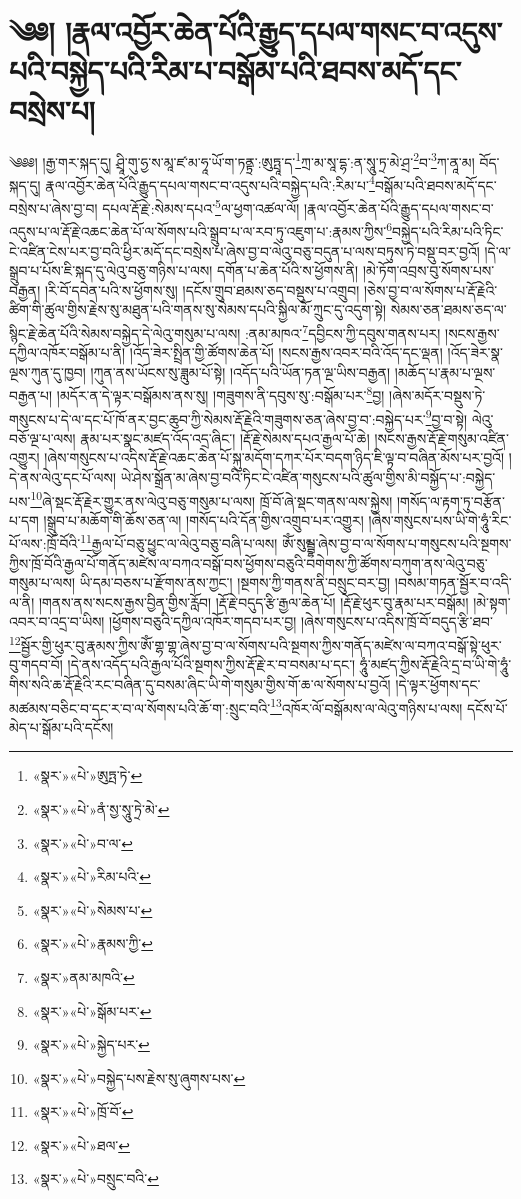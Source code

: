 \chapter{༄༅། །རྣལ་འབྱོར་ཆེན་པོའི་རྒྱུད་དཔལ་གསང་བ་འདུས་པའི་བསྐྱེད་པའི་རིམ་པ་བསྒོམ་པའི་ཐབས་མདོ་དང་བསྲེས་པ།}༄༅༅། །རྒྱ་གར་སྐད་དུ། ཤྲཱི་གུ་ཧྱ་ས་མཱ་ཛ་མ་ཧཱ་ཡོ་ག་ཏནྟྲ་:ཨུཏྤཱ་ད་\footnote{«སྣར་»«པེ་»ཨུཏྤ་ཏེ་}ཀྲ་མ་སཱ་དྷ་:ན་སཱུ་ཏྲ་མེ་ཤྲ་\footnote{«སྣར་»«པེ་»ནཾ་སྱ་སཱུ་ཏྲེ་མེ་}བ་\footnote{«སྣར་»«པེ་»བ་ལ་}ཀ་ནཱ་མ། བོད་སྐད་དུ། རྣལ་འབྱོར་ཆེན་པོའི་རྒྱུད་དཔལ་གསང་བ་འདུས་པའི་བསྐྱེད་པའི་:རིམ་པ་\footnote{«སྣར་»«པེ་»རིམ་པའི་}བསྒོམ་པའི་ཐབས་མདོ་དང་བསྲེས་པ་ཞེས་བྱ་བ། དཔལ་རྡོ་རྗེ་:སེམས་དཔའ་\footnote{«སྣར་»«པེ་»སེམས་པ་}ལ་ཕྱག་འཚལ་ལོ། །རྣལ་འབྱོར་ཆེན་པོའི་རྒྱུད་དཔལ་གསང་བ་འདུས་པ་ལ་རྡོ་རྗེ་འཆང་ཆེན་པོ་ལ་སོགས་པའི་སྒྲུབ་པ་ལ་རབ་ཏུ་འཇུག་པ་:རྣམས་ཀྱིས་\footnote{«སྣར་»«པེ་»རྣམས་ཀྱི་}བསྐྱེད་པའི་རིམ་པའི་ཏིང་ངེ་འཛིན་ངེས་པར་བྱ་བའི་ཕྱིར་མདོ་དང་བསྲེས་པ་ཞེས་བྱ་བ་ལེའུ་བཅུ་བདུན་པ་ལས་བཏུས་ཏེ་བསྡུ་བར་བྱའོ། །དེ་ལ་སྒྲུབ་པ་པོས་ཇི་སྐད་དུ་ལེའུ་བཅུ་གཉིས་པ་ལས། དགོན་པ་ཆེན་པོའི་ས་ཕྱོགས་ནི། །མེ་ཏོག་འབྲས་བུ་སོགས་པས་བརྒྱན། །རི་བོ་དབེན་པའི་ས་ཕྱོགས་སུ། །དངོས་གྲུབ་ཐམས་ཅད་བསྡུས་པ་འགྲུབ། །ཅེས་བྱ་བ་ལ་སོགས་པ་རྡོ་རྗེའི་ཚིག་གི་ཚུལ་གྱིས་རྗེས་སུ་མཐུན་པའི་གནས་སུ་སེམས་དཔའི་སྐྱིལ་མོ་ཀྲུང་དུ་འདུག་སྟེ། སེམས་ཅན་ཐམས་ཅད་ལ་སྙིང་རྗེ་ཆེན་པོའི་སེམས་བསྐྱེད་དེ་ལེའུ་གསུམ་པ་ལས། :ནམ་མཁའ་\footnote{«སྣར་»ནམ་མཁའི་}དབྱིངས་ཀྱི་དབུས་གནས་པར། །སངས་རྒྱས་དཀྱིལ་འཁོར་བསྒོམ་པ་ནི། །འོད་ཟེར་སྤྲིན་གྱི་ཚོགས་ཆེན་པོ། །སངས་རྒྱས་འབར་བའི་འོད་དང་ལྡན། །འོད་ཟེར་སྣ་ལྔས་ཀུན་དུ་ཁྱབ། །ཀུན་ནས་ཡོངས་སུ་ཟླུམ་པོ་སྟེ། །འདོད་པའི་ཡོན་ཏན་ལྔ་ཡིས་བརྒྱན། །མཆོད་པ་རྣམ་པ་ལྔས་བརྒྱན་པ། །མདོར་ན་དེ་ལྟར་བསྒོམས་ནས་སུ། །གཟུགས་ནི་དབུས་སུ་:བསྒོམ་པར་\footnote{«སྣར་»«པེ་»སྒོམ་པར་}བྱ། །ཞེས་མདོར་བསྡུས་ཏེ་གསུངས་པ་དེ་ལ་དང་པོ་ཁོ་ནར་བྱང་ཆུབ་ཀྱི་སེམས་རྡོ་རྗེའི་གཟུགས་ཅན་ཞེས་བྱ་བ་:བསྐྱེད་པར་\footnote{«སྣར་»«པེ་»སྐྱེད་པར་}བྱ་བ་སྟེ། ལེའུ་བཅོ་ལྔ་པ་ལས། རྣམ་པར་སྣང་མཛད་འོད་འདྲ་ཞིང་། །རྡོ་རྗེ་སེམས་དཔའ་རྒྱལ་པོ་ཆེ། །སངས་རྒྱས་རྡོ་རྗེ་གསུམ་འཛིན་འགྱུར། །ཞེས་གསུངས་པ་འདིས་རྡོ་རྗེ་འཆང་ཆེན་པོ་སྐུ་མདོག་དཀར་པོར་བདག་ཉིད་ཇི་ལྟ་བ་བཞིན་མོས་པར་བྱའོ། །དེ་ནས་ལེའུ་དང་པོ་ལས། ཡེ་ཤེས་སྒྲོན་མ་ཞེས་བྱ་བའི་ཏིང་ངེ་འཛིན་གསུངས་པའི་ཚུལ་གྱིས་མི་བསྐྱོད་པ་:བསྐྱེད་པས་\footnote{«སྣར་»«པེ་»བསྐྱེད་པས་རྗེས་སུ་ཞུགས་པས་}ཞེ་སྡང་རྡོ་རྗེར་གྱུར་ནས་ལེའུ་བཅུ་གསུམ་པ་ལས། ཁྲོ་བོ་ཞེ་སྡང་གནས་ལས་སྐྱེས། །གསོད་ལ་རྟག་ཏུ་བརྩོན་པ་དག །སྒྲུབ་པ་མཆོག་གི་ཆོས་ཅན་ལ། །གསོད་པའི་དོན་གྱིས་འགྲུབ་པར་འགྱུར། །ཞེས་གསུངས་པས་ཡི་གེ་ཧཱུཾ་རིང་པོ་ལས་:ཁྲོ་བོའི་\footnote{«སྣར་»«པེ་»ཁྲོ་བོ་}རྒྱལ་པོ་བཅུ་ཕྱུང་ལ་ལེའུ་བཅུ་བཞི་པ་ལས། ཨོཾ་སུམྦྷ་ཞེས་བྱ་བ་ལ་སོགས་པ་གསུངས་པའི་སྔགས་ཀྱིས་ཁྲོ་བོའི་རྒྱལ་པོ་གནོད་མཛེས་ལ་བཀའ་བསྒོ་བས་ཕྱོགས་བཅུའི་བགེགས་ཀྱི་ཚོགས་བཀུག་ནས་ལེའུ་བཅུ་གསུམ་པ་ལས། ཡི་དམ་བཅས་པ་རྫོགས་ནས་ཀྱང་། །སྔགས་ཀྱི་གནས་ནི་བསྲུང་བར་བྱ། །བསམ་གཏན་སྦྱོར་བ་འདི་ལ་ནི། །གནས་ནས་སངས་རྒྱས་བྱིན་གྱིས་རློབ། །རྡོ་རྗེ་བདུད་རྩི་རྒྱལ་ཆེན་པོ། །རྡོ་རྗེ་ཕུར་བུ་རྣམ་པར་བསྒོམ། །མེ་སྟག་འབར་བ་འདྲ་བ་ཡིས། །ཕྱོགས་བཅུའི་དཀྱིལ་འཁོར་གདབ་པར་བྱ། །ཞེས་གསུངས་པ་འདིས་ཁྲོ་བོ་བདུད་རྩི་ཐབ་\footnote{«སྣར་»«པེ་»ཐལ་}སྦྱོར་གྱི་ཕུར་བུ་རྣམས་ཀྱིས་ཨོཾ་གྷ་གྷ་ཞེས་བྱ་བ་ལ་སོགས་པའི་སྔགས་ཀྱིས་གནོད་མཛེས་ལ་བཀའ་བསྒོ་སྟེ་ཕུར་བུ་གདབ་བོ། །དེ་ནས་འདོད་པའི་རྒྱལ་པོའི་སྔགས་ཀྱིས་རྡོ་རྗེ་ར་བ་བསམ་པ་དང་། ཧཱུཾ་མཛད་ཀྱིས་རྡོ་རྗེའི་དྲ་བ་ཡི་གེ་ཧཱུཾ་གིས་སའི་ཆ་རྡོ་རྗེའི་རང་བཞིན་དུ་བསམ་ཞིང་ཡི་གེ་གསུམ་གྱིས་གོ་ཆ་ལ་སོགས་པ་བྱའོ། །དེ་ལྟར་ཕྱོགས་དང་མཚམས་བཅིང་བ་དང་ར་བ་ལ་སོགས་པའི་ཆོ་ག་:སྲུང་བའི་\footnote{«སྣར་»«པེ་»བསྲུང་བའི་}འཁོར་ལོ་བསྒོམས་ལ་ལེའུ་གཉིས་པ་ལས། དངོས་པོ་མེད་པ་སྒོམ་པའི་དངོས། 